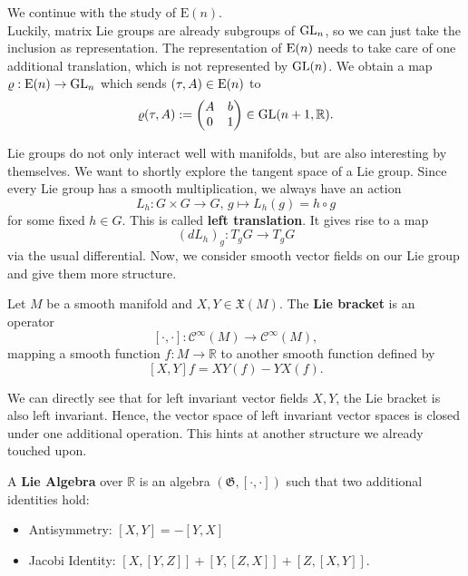 \begin{eg}
    We continue with the study of $\text{E}(n)$.\\
    Luckily, matrix Lie groups are already subgroups of $\operatorname{GL}_n$, so we can just take the inclusion as representation. The representation of $\operatorname{E}(n)$ needs to take care of one additional translation, which is not represented by $\operatorname{GL}(n)$. We obtain a map $\varrho: \operatorname{E}(n) \to \operatorname{GL}_n$ which sends $(\tau, A) \in \operatorname{E}(n)$ to \[
        \varrho(\tau, A):= \begin{pmatrix} A&b\\0&1 \end{pmatrix} \in \operatorname{GL}(n+1, \mathbb{R})
    .\] 
\end{eg}
Lie groups do not only interact well with manifolds, but are also interesting by themselves. We want to shortly explore the tangent space of a Lie group. Since every Lie group has a smooth multiplication, we always have an action \[
L_h: G \times G \to G, \, g \mapsto L_h(g)=h \circ g
\] for some fixed $h \in G$. This is called \textbf{left translation}. It gives rise to a map
\[
    (dL_h)_g: T_gG \to T_gG
\] via the usual differential. Now, we consider smooth vector fields on our Lie group and give them more structure.
\begin{definition}
    Let $M$ be a smooth manifold and $X,Y \in \mathfrak{X}(M)$. The \textbf{Lie bracket} is an operator
    \[
        [\cdot, \cdot]: \mathcal{C}^\infty(M) \to \mathcal{C}^\infty(M), 
    \]  mapping a smooth function $f: M \to \mathbb{R}$ to another smooth function defined by
    \[
        [X,Y]f=XY(f)-YX(f)
    .\]
\end{definition}
We can directly see that for left invariant vector fields $X,Y$, the Lie bracket is also left invariant. Hence, the vector space of left invariant vector spaces is closed under one additional operation. This hints at another structure we already touched upon.
\begin{definition}
    A \textbf{Lie Algebra} over $\mathbb{R}$ is an algebra $(\mathfrak{G}, [\cdot, \cdot])$ such that two additional identities hold:
\begin{itemize}
    \item Antisymmetry: $[X,Y]=-[Y,X]$
    \item Jacobi Identity: $[X,[Y,Z]]+[Y,[Z,X]]+[Z,[X,Y]]$.
\end{itemize}
\end{definition}
